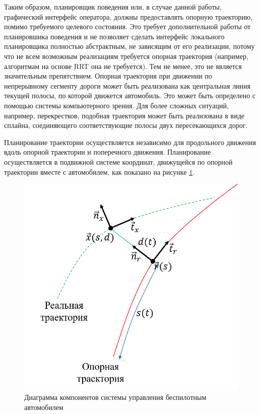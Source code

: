 Таким образом, планировщик поведения или, в случае данной работы, графический интерфейс оператора, должны предоставлять
опорную траекторию, помимо требуемого целевого состояния. Это требует дополнительной работы от планировшика поведения
и не позволяет сделать интерфейс локального планировщика полностью абстрактным, не зависящим от его реализации, потому
что не всем возможным реализациям требуется опорная траектория (например, алгоритмам на основе RRT она не требуется).
Тем не менее, это не является значительным препятствием. Опорная траектория при движении по непрерывному сегменту дороги
может быть реализована как центральная линия текущей полосы, по которой движется автомобиль. Это может быть определено
с помощью системы компьютерного зрения. Для более сложных ситуаций, например, перекрестков, подобная траектория может
быть реализована в виде сплайна, соединяющего соответствующие полосы двух пересекающихся дорог.

Планирование траектории осуществляется независимо для продольного движения вдоль опорной траектории и поперечного
движения. Планирование осуществляется в подвижной системе координат, движущейся по опорной траектории вместе с
автомобилем, как показано на рисунке \ref{img:frenet_frame}.

\begin{figure}[h]
      \centering
      \includegraphics[]{images/frenet_frame}
      \caption{Диаграмма компонентов системы управления беспилотным автомобилем}
      \label{img:frenet_frame}
\end{figure}


